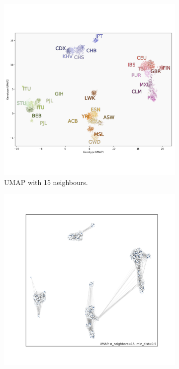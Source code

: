 \documentclass[12pt]{article}
\begin{document}
\begin{figure}[h!]
  \centering
  \begin{subfigure}[b]{0.48\linewidth}
    \includegraphics[width=\linewidth]{code/images/1KGP_genotype_UMAP_low_NN.png}
    \caption{UMAP with 15 neighbours.}
    \label{fig:UMAP_low_NN_1KGP}
  \end{subfigure}
  \begin{subfigure}[b]{0.48\linewidth}
    \includegraphics[width=\linewidth]{code/images/UMAP_connectivity_low_NN.png}

\end{subfigure}
\end{figure}
\end{document}
